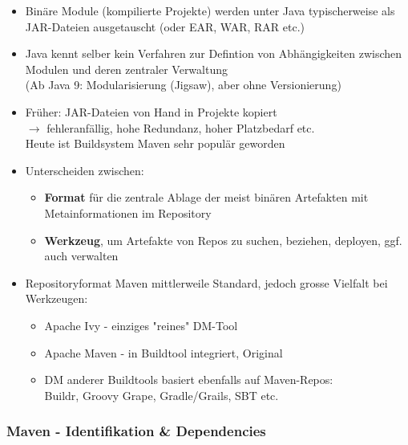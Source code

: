 \documentclass[a4paper]{article}
\begin{document}
	\begin{itemize}
		\item Binäre Module (kompilierte Projekte) werden unter Java typischerweise als JAR-Dateien ausgetauscht (oder EAR, WAR, RAR etc.)
		
		\item Java kennt selber kein Verfahren zur Defintion von Abhängigkeiten zwischen Modulen und deren zentraler Verwaltung\\
		(Ab Java 9: Modularisierung (Jigsaw), aber ohne Versionierung)
		
		\item Früher: JAR-Dateien von Hand in Projekte kopiert \\
		$\rightarrow$ fehleranfällig, hohe Redundanz, hoher Platzbedarf etc.\\
		Heute ist Buildsystem Maven sehr populär geworden
		
		\item Unterscheiden zwischen:
		\begin{itemize}
			\item \textbf{Format} für die zentrale Ablage der meist binären Artefakten mit Metainformationen im Repository
			\item \textbf{Werkzeug}, um Artefakte von Repos zu suchen, beziehen, deployen, ggf. auch verwalten
		\end{itemize}
	
		\item Repositoryformat Maven mittlerweile Standard, jedoch grosse Vielfalt bei Werkzeugen:
		\begin{itemize}
			\item Apache Ivy - einziges "reines" DM-Tool
			\item Apache Maven - in Buildtool integriert, Original
			\item DM anderer Buildtools basiert ebenfalls auf Maven-Repos:\\
				Buildr, Groovy Grape, Gradle/Grails, SBT etc. 
		\end{itemize}
	\end{itemize}

		\subsubsection{Maven - Identifikation \& Dependencies}
		
\end{document}

